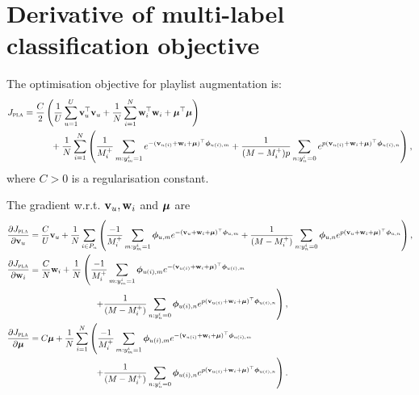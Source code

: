 \section{Derivative of multi-label classification objective}

The optimisation objective for playlist augmentation is:
\begin{equation*}
\begin{aligned}
J_\textsc{pla} &= \frac{C}{2} \left( \frac{1}{U} \sum_{u=1}^U \mathbf{v}_u^\top \mathbf{v}_u 
     + \frac{1}{N} \sum_{i=1}^N \mathbf{w}_i^\top \mathbf{w}_i + \bm{\mu}^\top \bm{\mu} \right) \\
& \hspace{3em}
     + \frac{1}{N} \sum_{i=1}^N \left( \frac{1}{M_i^+} \sum_{m: y_m^i = 1} e^{-(\mathbf{v}_{u(i)} + \mathbf{w}_i + \bm{\mu})^\top \bm{\phi}_{u(i),m}} 
     + \frac{1}{(M - M_i^+) p} \sum_{n: y_n^i = 0} e^{p (\mathbf{v}_{u(i)} + \mathbf{w}_i + \bm{\mu})^\top \bm{\phi}_{u(i),n}} \right),
\end{aligned}
\end{equation*}
where $C > 0$ is a regularisation constant.

The gradient w.r.t. $\mathbf{v}_u, \mathbf{w}_i$ and $\bm{\mu}$ are
\begin{equation*}
\begin{aligned}
\frac{\partial J_\textsc{pla}}{\partial \mathbf{v}_u}
&= \frac{C}{U} \mathbf{v}_u + \frac{1}{N} \sum_{i \in P_u} \left( 
   \frac{-1}{M_i^+} \sum_{m: y_m^i = 1} \bm{\phi}_{u,m} e^{-(\mathbf{v}_{u} + \mathbf{w}_i + \bm{\mu})^\top \bm{\phi}_{u,m}}
   + \frac{1}{(M - M_i^+)} \sum_{n: y_n^i = 0} \bm{\phi}_{u,n} e^{p (\mathbf{v}_{u} + \mathbf{w}_i + \bm{\mu})^\top \bm{\phi}_{u,n}} \right), \\
\frac{\partial J_\textsc{pla}}{\partial \mathbf{w}_i}
&= \frac{C}{N} \mathbf{w}_i + \frac{1}{N} \left( 
   \frac{-1}{M_i^+} \sum_{m: y_m^i = 1} \bm{\phi}_{u(i),m} e^{-(\mathbf{v}_{u(i)} + \mathbf{w}_i + \bm{\mu})^\top \bm{\phi}_{u(i),m}} \right. \\
& \hspace{7.5em} \left.
   + \frac{1}{(M - M_i^+)} \sum_{n: y_n^i = 0} \bm{\phi}_{u(i),n} e^{p (\mathbf{v}_{u(i)} + \mathbf{w}_i + \bm{\mu})^\top \bm{\phi}_{u(i),n}} \right), \\
\frac{\partial J_\textsc{pla}}{\partial \bm{\mu}}
&= C \bm{\mu} + \frac{1}{N} \sum_{i=1}^N \left( 
   \frac{-1}{M_i^+} \sum_{m: y_m^i = 1} \bm{\phi}_{u(i),m} e^{-(\mathbf{v}_{u(i)} + \mathbf{w}_i + \bm{\mu})^\top \bm{\phi}_{u(i),m}} \right. \\
& \hspace{7.5em} \left.
   + \frac{1}{(M - M_i^+)} \sum_{n: y_n^i = 0} \bm{\phi}_{u(i),n} e^{p (\mathbf{v}_{u(i)} + \mathbf{w}_i + \bm{\mu})^\top \bm{\phi}_{u(i),n}} \right).
\end{aligned}
\end{equation*}


